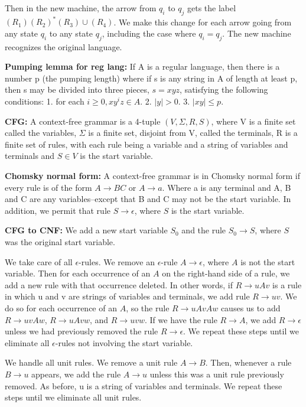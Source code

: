 \documentclass[12pt]{article}
\begin{document}
Then in the new machine, the arrow from $q_i$ to $q_j$ gets the label $(R_1)(R_2)^*(R_3)\cup(R_4)$. We make this change for each arrow going from any state $q_i$ to any state $q_j$, including the case where $q_i = q_j$. The new machine recognizes the original language.

\textbf{Pumping lemma for reg lang:} If A is a regular language, then there is a number p (the pumping length) where if s is any string in A of length at least p, then s may be divided into three pieces, $s = xyz$, satisfying the following conditions: 1. for each $i \geq 0, xy^iz \in A$. 2. $|y| > 0$. 3. $|xy| \leq p$.

\textbf{CFG:} A context-free grammar is a 4-tuple $(V,\Sigma,R,S)$, where V is a finite set called the variables, $\Sigma$ is a finite set, disjoint from V, called the terminals, R is a finite set of rules, with each rule being a variable and a string of variables and terminals and $S \in V$ is the start variable.

\textbf{Chomsky normal form:} A context-free grammar is in Chomsky normal form if every rule is of the form $A \rightarrow BC$ or $A \rightarrow a$. Where a is any terminal and A, B and C are any variables--except that B and C may not be the start variable. In addition, we permit that rule $S \rightarrow \epsilon$, where $S$ is the start variable.

\textbf{CFG to CNF: } We add a new start variable $S_0$ and the rule $S_0 \rightarrow S$, where $S$ was the original start variable.

We take care of all $\epsilon$-rules. We remove an $\epsilon$-rule $A \rightarrow \epsilon$, where $A$ is not the start variable. Then for each occurrence of an $A$ on the right-hand side of a rule, we add a new rule with that occurrence deleted. In other words, if $R \rightarrow uAv$ is a rule in which u and v are strings of variables and terminals, we add rule $R \rightarrow uv$. We do so for each occurrence of an $A$, so the rule $R \rightarrow uAvAw$ causes us to add $R \rightarrow uvAw$, $R \rightarrow uAvw$, and $R \rightarrow uvw$. If we have the rule $R \rightarrow A$, we add $R \rightarrow \epsilon$ unless we had previously removed the rule $R \rightarrow \epsilon$. We repeat these steps until we eliminate all $\epsilon$-rules not involving the start variable.

We handle all unit rules. We remove a unit rule $A \rightarrow B$. Then, whenever a rule $B \rightarrow u$ appears, we add the rule $A \rightarrow u$ unless this was a unit rule previously removed. As before, u is a string of variables and terminals. We repeat these steps until we eliminate all unit rules.
\end{document}

